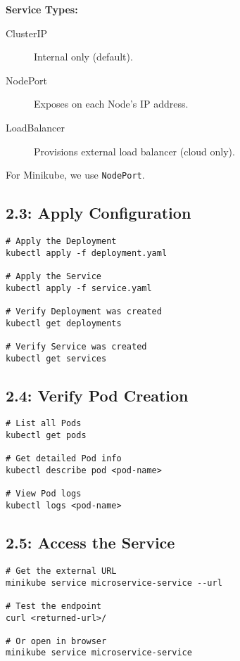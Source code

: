 \documentclass[12pt,a4paper]{article}
\begin{document}
\textbf{Service Types:}

\begin{description}
    \item[ClusterIP] Internal only (default).
    \item[NodePort] Exposes on each Node's IP address.
    \item[LoadBalancer] Provisions external load balancer (cloud only).
\end{description}

For Minikube, we use \texttt{NodePort}.

\subsection{2.3: Apply Configuration}

\begin{lstlisting}[caption=Deploy to cluster]
# Apply the Deployment
kubectl apply -f deployment.yaml

# Apply the Service
kubectl apply -f service.yaml

# Verify Deployment was created
kubectl get deployments

# Verify Service was created
kubectl get services
\end{lstlisting}

\subsection{2.4: Verify Pod Creation}

\begin{lstlisting}[caption=Check Pods]
# List all Pods
kubectl get pods

# Get detailed Pod info
kubectl describe pod <pod-name>

# View Pod logs
kubectl logs <pod-name>
\end{lstlisting}

\subsection{2.5: Access the Service}

\begin{lstlisting}[caption=Access the service]
# Get the external URL
minikube service microservice-service --url

# Test the endpoint
curl <returned-url>/

# Or open in browser
minikube service microservice-service
\end{lstlisting}
\end{document}
